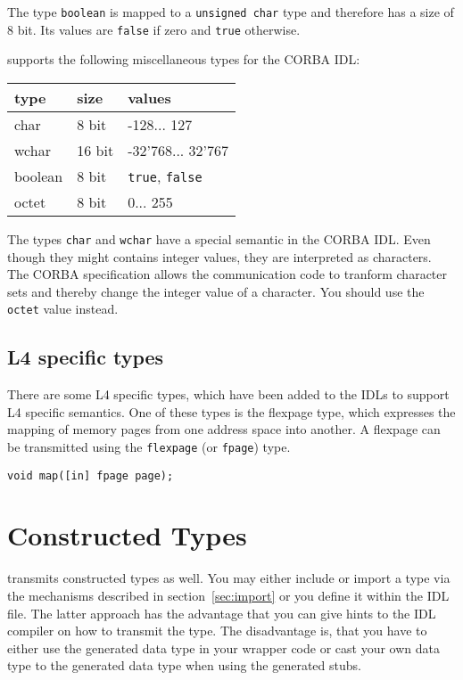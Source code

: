 The type {\tt boolean} is mapped to a {\tt unsigned char} type and
therefore has a size of 8 bit. Its values are {\tt false} if zero
and {\tt true} otherwise.

\dice{} supports the following miscellaneous types for the
CORBA IDL:

\begin{center}
\begin{tabular}{|l|l|l|}
\hline
type & size & values \\
\hline
char & 8 bit & -128... 127 \\
wchar & 16 bit & -32'768... 32'767 \\
boolean & 8 bit & {\tt true}, {\tt false} \\
octet & 8 bit & 0... 255 \\
\hline
\end{tabular}
\end{center}

The types {\tt char} and {\tt wchar} have a special semantic in the
CORBA IDL. Even though they might contains integer values, they are
interpreted as characters. The CORBA specification allows the communication
code to tranform character sets and thereby change the integer value of
a character. You should use the {\tt octet} value instead.

\subsection{L4 specific types}
There are some L4 specific types, which have been added to the
IDLs to support L4 specific semantics.
One of these types is the flexpage type, which expresses the
mapping of memory pages from one address space into another.
A flexpage can be transmitted using the {\tt flexpage} (or {\tt fpage})
type.

\begin{verbatim}
void map([in] fpage page);
\end{verbatim}

\section{Constructed Types}

\dice{} transmits constructed types as well. You may either include
or import a type via the mechanisms described in section~\ref{sec:import}
or you define it within the IDL file. The latter approach has the
advantage that you can give hints to the IDL compiler on how to
transmit the type. The disadvantage is, that you have to either
use the generated data type in your wrapper code or cast your own 
data type to the generated data type when using the generated stubs.

